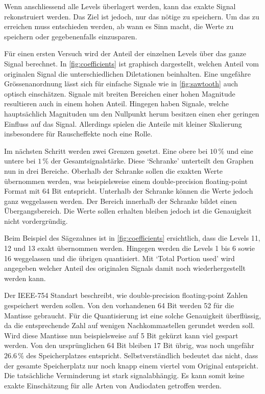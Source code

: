 \begin{refsection}
Wenn anschliessend alle Levels überlagert werden, kann das exakte Signal rekonstruiert werden.
Das Ziel ist jedoch, nur das nötige zu speichern.
Um das zu erreichen muss entschieden werden, ab wann es Sinn macht, die Werte zu speichern oder gegebenenfalls einzusparen.

Für einen ersten Versuch wird der Anteil der einzelnen Levels über das ganze Signal berechnet.
In \autoref{fig:coefficients} ist graphisch dargestellt, welchen Anteil vom originalen Signal die unterschiedlichen Diletationen beinhalten.
Eine ungefähre Grössenanordnung lässt sich für einfache Signale wie in \autoref{fig:sawtooth} auch optisch einschätzen.
Signale mit breiten Bereichen einer hohen Magnitude resultieren auch in einem hohen Anteil. 
Hingegen haben Signale, welche hauptsächlich Magnituden um den Nullpunkt herum besitzen einen eher geringen Einfluss auf das Signal.
Allerdings spielen die Anteile mit kleiner Skalierung insbesondere für Rauscheffekte noch eine Rolle.

Im nächsten Schritt werden zwei Grenzen gesetzt.
Eine obere bei  $10\,\text{\%}$ und eine untere bei $1\,\text{\%}$ der Gesamtsignalstärke.
Diese `Schranke' unterteilt den Graphen nun in drei Bereiche. 
Oberhalb der Schranke sollen die exakten Werte übernommen werden, was beispielsweise einem double-precision floating-point Format mit 64 Bit entspricht.
Unterhalb der Schranke können die Werte jedoch ganz weggelassen werden.
Der Bereich innerhalb der Schranke bildet einen Übergangsbereich.
Die Werte sollen erhalten bleiben jedoch ist die Genauigkeit nicht vordergründig.

Beim Beispiel des Sägezahnes ist in \autoref{fig:coefficients} ersichtlich, dass die Levels 11, 12 und 13 exakt übernommen werden.
Hingegen werden die Levels 1 bis 6 sowie 16 weggelassen und die übrigen quantisiert.
Mit `Total Portion used' wird angegeben welcher Anteil des originalen Signals damit noch wiederhergestellt werden kann.

Der IEEE-754 Standart \cite{article:IEEE-754} beschreibt, wie double-precision floating-point Zahlen gespeichert werden sollen. 
Von den vorhandenen 64 Bit werden 52 für die Mantisse gebraucht.
Für die Quantisierung ist eine solche Genauigkeit überflüssig, da die entsprechende Zahl auf wenigen Nachkommastellen gerundet werden soll.
Wird diese Mantisse nun beispielsweise auf 5 Bit gekürzt kann viel gespart werden.
Von den ursprünglichen 64 Bit bleiben 17 Bit übrig, was noch ungefähr $26.6\,\text{\%}$ des Speicherplatzes entspricht.
Selbstverständlich bedeutet das nicht, dass der gesamte Speicherplatz nur noch knapp einem viertel vom Original entspricht. 
Die tatsächliche Verminderung ist stark signalabhängig.
Es kann somit keine exakte Einschätzung für alle Arten von Audiodaten getroffen werden. 


\end{refsection}
